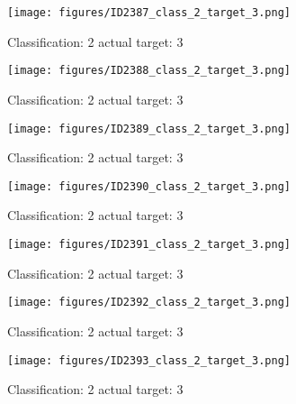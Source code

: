 \begin{figure}[h!]
\begin{center}
\texttt{[image: figures/ID2387\_class\_2\_target\_3.png]}
\end{center}
\caption{ Classification: 2 actual target: 3}
\label{fig:ID2387_class_2_target_3}
\end{figure}
\begin{figure}[h!]
\begin{center}
\texttt{[image: figures/ID2388\_class\_2\_target\_3.png]}
\end{center}
\caption{ Classification: 2 actual target: 3}
\label{fig:ID2388_class_2_target_3}
\end{figure}
\begin{figure}[h!]
\begin{center}
\texttt{[image: figures/ID2389\_class\_2\_target\_3.png]}
\end{center}
\caption{ Classification: 2 actual target: 3}
\label{fig:ID2389_class_2_target_3}
\end{figure}
\begin{figure}[h!]
\begin{center}
\texttt{[image: figures/ID2390\_class\_2\_target\_3.png]}
\end{center}
\caption{ Classification: 2 actual target: 3}
\label{fig:ID2390_class_2_target_3}
\end{figure}
\begin{figure}[h!]
\begin{center}
\texttt{[image: figures/ID2391\_class\_2\_target\_3.png]}
\end{center}
\caption{ Classification: 2 actual target: 3}
\label{fig:ID2391_class_2_target_3}
\end{figure}
\begin{figure}[h!]
\begin{center}
\texttt{[image: figures/ID2392\_class\_2\_target\_3.png]}
\end{center}
\caption{ Classification: 2 actual target: 3}
\label{fig:ID2392_class_2_target_3}
\end{figure}
\begin{figure}[h!]
\begin{center}
\texttt{[image: figures/ID2393\_class\_2\_target\_3.png]}
\end{center}
\caption{ Classification: 2 actual target: 3}
\label{fig:ID2393_class_2_target_3}
\end{figure}

